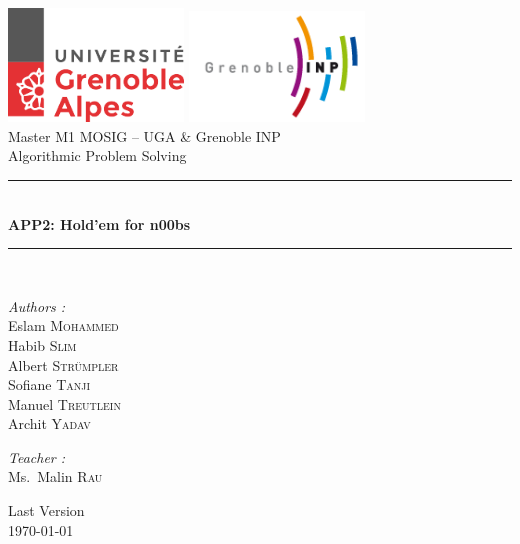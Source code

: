 \documentclass[a4paper,12pt,fleqn]{article}
\begin{document}

\begin{titlepage}
\begin{center}

\includegraphics[width=0.35\textwidth]{logo-uga.png}
\includegraphics[width=0.35\textwidth]{logoinp.png} \\[1cm]

{\large Master M1 MOSIG – UGA \& Grenoble INP} \\[0.8cm]
{\large Algorithmic Problem Solving}\\[0.5cm]

\rule{\linewidth}{0.5mm} \\[0.4cm]
{ \huge \bfseries APP2: Hold’em for n00bs \\[0.4cm] }
\rule{\linewidth}{0.5mm} \\[1.5cm]

\noindent
\begin{minipage}{0.4\textwidth}
  \begin{flushleft} \large
    \emph{Authors :}\\
    Eslam \textsc{Mohammed}\\
    Habib \textsc{Slim}\\
    Albert \textsc{Strümpler}\\
    Sofiane \textsc{Tanji}\\
    Manuel \textsc{Treutlein}\\
    Archit \textsc{Yadav}
  \end{flushleft}
\end{minipage}%
\begin{minipage}{0.4\textwidth}
  \begin{flushright} \large
    \emph{Teacher :} \\
    Ms.~Malin \textsc{Rau}\\
  \end{flushright}
\end{minipage}

\vfill

{\large Last Version \\ \today}

\end{center}
\end{titlepage}
\end{document}
